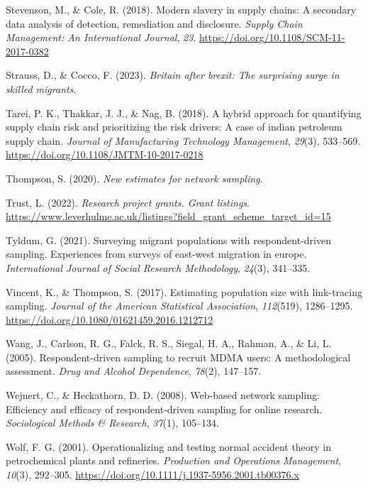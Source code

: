 \documentclass[
  12pt,
]{article}
\newlength{\cslhangindent}
\newenvironment{CSLReferences}[2] %
 {\begin{list}{}{%
  \setlength{\itemindent}{0pt}
  \setlength{\leftmargin}{0pt}
  \setlength{\parsep}{0pt}
  \ifodd #1
   \setlength{\leftmargin}{\cslhangindent}
   \setlength{\itemindent}{-1\cslhangindent}
  \fi
  \setlength{\itemsep}{#2\baselineskip}}}
 {\end{list}}
\theoremstyle{plain}
\theoremstyle{definition}
\begin{document}
\begin{CSLReferences}{1}{0}
Stevenson, M., \& Cole, R. (2018). Modern slavery in supply chains: A
secondary data analysis of detection, remediation and disclosure.
\emph{Supply Chain Management: An International Journal}, \emph{23}.
\url{https://doi.org/10.1108/SCM-11-2017-0382}

Strauss, D., \& Cocco, F. (2023). \emph{Britain after brexit: The
surprising surge in skilled migrants}.

Tarei, P. K., Thakkar, J. J., \& Nag, B. (2018). A hybrid approach for
quantifying supply chain risk and prioritizing the risk drivers: A case
of indian petroleum supply chain. \emph{Journal of Manufacturing
Technology Management}, \emph{29}(3), 533--569.
\url{https://doi.org/10.1108/JMTM-10-2017-0218}

Thompson, S. (2020). \emph{New estimates for network sampling}.

Trust, L. (2022). \emph{Research project grants. Grant listings}.
\url{https://www.leverhulme.ac.uk/listings?field_grant_scheme_target_id=15}

Tyldum, G. (2021). Surveying migrant populations with respondent-driven
sampling. Experiences from surveys of east-west migration in europe.
\emph{International Journal of Social Research Methodology},
\emph{24}(3), 341--335.

Vincent, K., \& Thompson, S. (2017). Estimating population size with
link-tracing sampling. \emph{Journal of the American Statistical
Association}, \emph{112}(519), 1286--1295.
\url{https://doi.org/10.1080/01621459.2016.1212712}

Wang, J., Carlson, R. G., Falck, R. S., Siegal, H. A., Rahman, A., \&
Li, L. (2005). Respondent-driven sampling to recruit {MDMA} users: A
methodological assessment. \emph{Drug and Alcohol Dependence},
\emph{78}(2), 147--157.

Wejnert, C., \& Heckathorn, D. D. (2008). Web-based network sampling:
Efficiency and efficacy of respondent-driven sampling for online
research. \emph{Sociological Methods \& Research}, \emph{37}(1),
105--134.

Wolf, F. G. (2001). Operationalizing and testing normal accident theory
in petrochemical plants and refineries. \emph{Production and Operations
Management}, \emph{10}(3), 292--305.
\url{https://doi.org/10.1111/j.1937-5956.2001.tb00376.x}


\end{CSLReferences}
\end{document}
